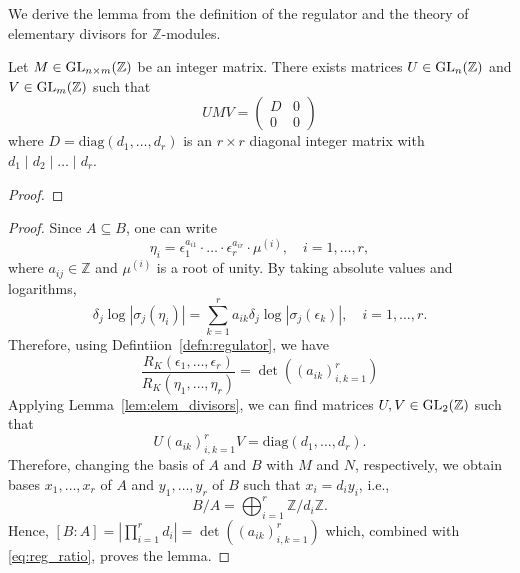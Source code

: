 We derive the lemma from the definition of the regulator and the theory of elementary divisors for 
$\mathbb{Z}$-modules.

\begin{lemma}\label{lem:elem_divisors}
    \leanok
    Let $M \in \operatorname{GL}_{n \times m}(\mathbb{Z})$ be an integer matrix. 
    There exists matrices $U \in \operatorname{GL}_n(\mathbb{Z})$ and 
    $V \in \operatorname{GL}_m(\mathbb{Z})$ such that 
    $$
    U M V = 
    \begin{pmatrix}
        D & 0 \\
        0 & 0 
    \end{pmatrix}
    $$ 
    where $D = \textrm{diag}(d_1, \dots, d_r)$ is an $r \times r$ 
    diagonal integer matrix with $d_1 \mid d_2 \mid \dots \mid d_r$.  
\end{lemma}

\begin{proof}
    \leanok
\end{proof}

\begin{proof}
    Since $A \subseteq B$, one can write 
    $$
    \eta_i = \epsilon_1^{a_{i1}} \cdot \dots \cdot \epsilon_r^{a_{i r}} \cdot \mu^{(i)}, \quad i = 1, \dots, r, 
    $$
    where $a_{ij} \in \mathbb{Z}$ and $\mu^{(i)}$ is a root of unity. By taking absolute values and logarithms, 
    $$
    \delta_j \log | \sigma_j(\eta_i) | = \sum_{k = 1}^r a_{ik} \delta_j \log | \sigma_j(\epsilon_k) |, \quad i = 1, \dots, r. 
    $$
    Therefore, using Defintiion~\ref{defn:regulator}, we have
    \begin{equation}\label{eq:reg_ratio}
    \frac{R_K(\epsilon_1, \dots, \epsilon_r)}{R_K(\eta_1, \dots, \eta_r)} = \det ((a_{ik})_{i, k = 1}^r)
    \end{equation}
    Applying Lemma~\ref{lem:elem_divisors}, we can find matrices $U, V \in \operatorname{GL}_2(\mathbb{Z})$ such that 
    $$
    U (a_{ik})_{i, k = 1}^r V = \text{diag}(d_1, \dots, d_r). 
    $$
    Therefore, changing the basis of $A$ and $B$ with $M$ and $N$, respectively, we obtain bases 
    $x_1, \dots, x_r$ of $A$ and $y_1, \dots, y_r$ of $B$ such that $x_i = d_i y_i$, i.e., 
    $$
    B / A = \bigoplus_{i = 1}^r \mathbb{Z} / d_i \mathbb{Z}. 
    $$
    Hence, $[B : A] = |\prod_{i = 1}^r d_i | = \det ((a_{ik})_{i, k = 1}^r)$ which, combined with \eqref{eq:reg_ratio}, 
    proves the lemma.  
\end{proof}


